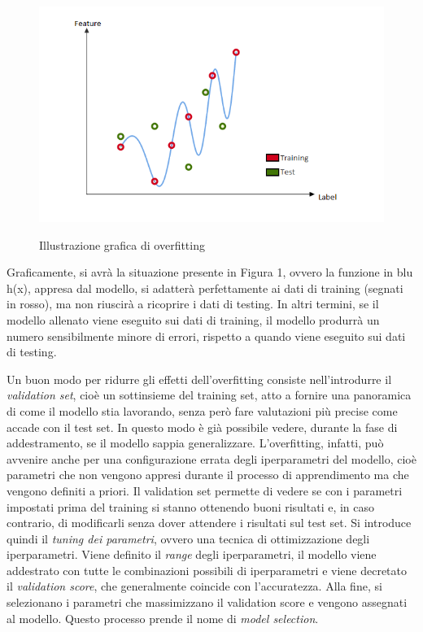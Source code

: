 \documentclass[11pt]{article}
\begin{document}
\begin{figure}[h!]
\begin{center}
  \includegraphics[width=13cm]{Immagini/Overfitting.png}\\
  \caption{Illustrazione grafica di overfitting}
\end{center}
\end{figure}

Graficamente, si avrà la situazione presente in Figura 1, ovvero la funzione in blu  h(x), appresa dal modello, si adatterà perfettamente ai dati di training (segnati in rosso), ma non riuscirà a ricoprire i dati di testing. In altri termini, se il modello allenato viene eseguito sui dati di training, il modello produrrà un numero sensibilmente minore di errori, rispetto a quando viene eseguito sui dati di testing. 

Un buon modo per ridurre gli effetti dell'overfitting consiste nell'introdurre il \textit{validation set}, cioè un sottinsieme del training set, atto a fornire una panoramica di come il modello stia lavorando, senza però fare valutazioni più precise come accade con il test set. In questo modo è già possibile vedere, durante la fase di addestramento, se il modello sappia generalizzare. L'overfitting, infatti, può avvenire anche per una configurazione errata degli iperparametri del modello, cioè parametri che non vengono appresi durante il processo di apprendimento ma che vengono definiti a priori. Il validation set permette di vedere se con i parametri impostati prima del training si stanno ottenendo buoni risultati e, in caso contrario, di modificarli senza dover attendere i risultati sul test set. Si introduce quindi il \textit{tuning dei parametri}, ovvero una tecnica di ottimizzazione degli iperparametri. Viene definito il \textit{range} degli iperparametri, il modello viene addestrato con tutte le combinazioni possibili di iperparametri e viene decretato il \textit{validation score}, che generalmente coincide con l'accuratezza. Alla fine, si selezionano i parametri che massimizzano il validation score e vengono assegnati al modello. Questo processo prende il nome di \textit{model selection}. 
\end{document}

